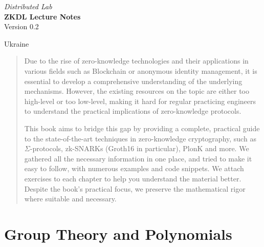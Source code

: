 \documentclass{zkdl-template}
\def\maketitle{
    \begin{center}
        {\Large\sffamily \emph{Distributed Lab}} \\ \vspace{30mm}
        {\huge\sffamily\bfseries ZKDL Lecture Notes} \\ \vspace{5mm}
        {Version 0.2} \\ \vspace{10mm}
    \end{center}
    
    \vfill

    \begin{center}
        {Ukraine} \\ \vspace{2mm}
        {\sffamily \the\year}
    \end{center}

    \thispagestyle{empty}
    \pagebreak
}
\begin{document}
    \maketitle

    \pagecolor{white}

    \vspace*{\fill}

    \begin{abstract}
        \fontsize{10}{12}\selectfont
        Due to the rise of zero-knowledge technologies and their applications in
        various fields such as Blockchain or anonymous identity management, it is
        essential to develop a comprehensive understanding of the underlying
        mechanisms. However, the existing resources on the topic are either too
        high-level or too low-level, making it hard for regular practicing engineers
        to understand the practical implications of zero-knowledge protocols.
    
        This book aims to bridge this gap by providing a complete, practical guide
        to the state-of-the-art techniques in zero-knowledge cryptography, such as
        $\Sigma$-protocols, zk-SNARKs (Groth16 in particular), PlonK and more. We
        gathered all the necessary information in one place, and tried to make it
        easy to follow, with numerous examples and code snippets. We attach
        exercises to each chapter to help you understand the material better.
        Despite the book's practical focus, we preserve the mathematical rigor where
        suitable and necessary.
    \end{abstract}
    
    \vspace*{\fill}

    \thispagestyle{empty}
    \newpage

    \pagestyle{fancy}
    \pagecolor{white}

    \tableofcontents

\pagebreak



% 

\section{Group Theory and Polynomials}\label{section:math-crypto-1}
\end{document}
